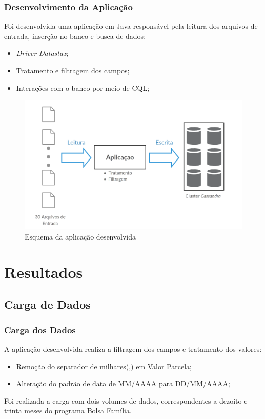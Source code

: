 \documentclass[brazil]{beamer}
\begin{document}
\begin{frame}
	\frametitle{Desenvolvimento da Aplicação}
	
	Foi desenvolvida uma aplicação em Java responsável pela leitura dos arquivos de entrada, inserção no banco e busca de dados:
	\begin{itemize}
		\item \emph{Driver} \emph{Datastax};
		\item Tratamento e filtragem dos campos;
		\item Interações com o banco por meio de CQL;
	\end{itemize}

	 \begin{figure}
		\includegraphics[width=0.7\linewidth]{figuras/aplicacao.png}
		\caption{Esquema da aplicação desenvolvida}
	\end{figure}
\end{frame}

\section{Resultados}

\subsection{Carga de Dados}
\begin{frame}
	\frametitle{Carga dos Dados}
	A aplicação desenvolvida realiza a filtragem dos campos e tratamento dos valores:
	\begin{itemize}
		\item Remoção do separador de milhares(,) em Valor Parcela;
		\item Alteração do padrão de data de MM/AAAA para DD/MM/AAAA;		
	\end{itemize}

	Foi realizada a carga com dois volumes de dados, correspondentes a dezoito e trinta meses do programa Bolsa Família.
	\begin{table}
		\centering
		\caption{Volume de dados}
	\end{table}	
\end{frame}
\end{document}
